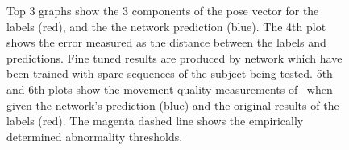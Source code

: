 \documentclass[11pt]{article} %
\begin{document}
\begin{figure}
\ContinuedFloat
\centering
%
\qquad%
%
\caption{Top 3 graphs show the 3 components of the pose vector for the labels (red), and the the network prediction (blue). The 4th plot shows the error measured as the distance between the labels and predictions. Fine tuned results are produced by network which have been trained with spare sequences of the subject being tested. 5th and 6th plots show the movement quality measurements of~\cite{Paiement} when given the network's prediction (blue) and the original results of the labels (red). The magenta dashed line shows the empirically determined abnormality thresholds. }
\label{fig:s7-12}
\end{figure}
\end{document}
